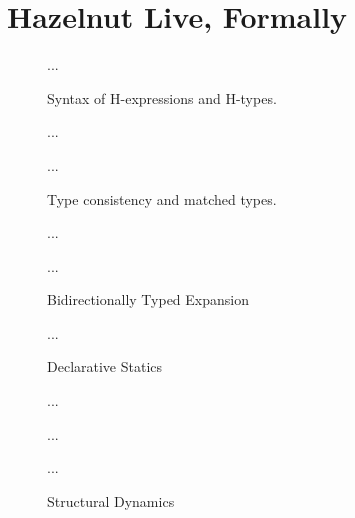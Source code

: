 
\clearpage
\newcommand{\calculusSec}{Hazelnut Live, Formally}
\section{\protect\calculusSec}
\label{sec:calculus}

\begin{figure}[h]
...
\caption{Syntax of H-expressions and H-types.}
\end{figure}

\begin{figure}[h]
...

...
\caption{Type consistency and matched types.}
\end{figure}

\begin{figure}[h]
...

...
\caption{Bidirectionally Typed Expansion}
\end{figure}

\begin{figure}[h!]
...
\caption{Declarative Statics}
\end{figure}

\begin{figure}[h!]
...

...

...
\caption{Structural Dynamics}
\end{figure}
